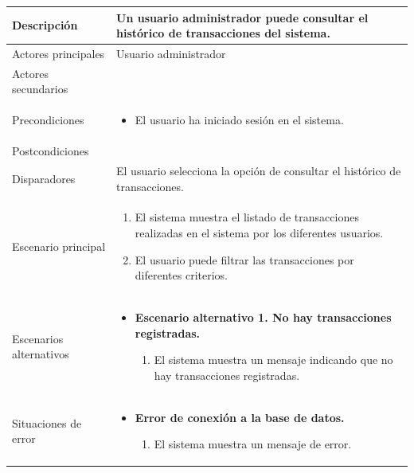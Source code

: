 \begin{longtable}{
   >{\columncolor{lightgreen!20}}p{4cm} %
    >{\columncolor{white}}p{12cm}        %
    }
    \midrule
    Descripción & Un usuario administrador puede consultar el histórico de transacciones del sistema. \\
    \midrule
    Actores principales & Usuario administrador \\
    \midrule
    Actores secundarios &  \\
    \midrule
    Precondiciones & \begin{itemize}[nosep,leftmargin=*]
        \item El usuario ha iniciado sesión en el sistema.
    \end{itemize} \\
    \midrule
    Postcondiciones &  \\
    \midrule
    Disparadores & El usuario selecciona la opción de consultar el histórico de transacciones. \\
    \midrule
    Escenario principal & \begin{enumerate}[nosep,leftmargin=*]
        \item El sistema muestra el listado de transacciones realizadas en el sistema por los diferentes usuarios.
        \item El usuario puede filtrar las transacciones por diferentes criterios.
    \end{enumerate} \\
    \midrule
    Escenarios alternativos & 
    \begin{itemize}[nosep,leftmargin=*]
        \item \textbf{Escenario alternativo 1. No hay transacciones registradas.}
        \begin{enumerate}[nosep,leftmargin=*]
            \item El sistema muestra un mensaje indicando que no hay transacciones registradas.
        \end{enumerate}
    \end{itemize} \\
    \midrule
    Situaciones de error & 
    \begin{itemize}[nosep,leftmargin=*]
        \item \textbf{Error de conexión a la base de datos.}
        \begin{enumerate}[nosep,leftmargin=*]
            \item El sistema muestra un mensaje de error.
        \end{enumerate}
    \end{itemize} \\
\end{longtable}

